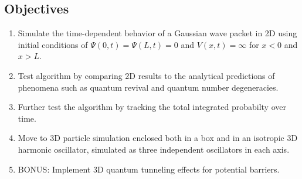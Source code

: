\documentclass[11pt, letterpaper]{article}
\begin{document}
\subsection*{Objectives}

\begin{enumerate}[noitemsep, topsep=0pt, parsep=0pt, partopsep=0pt]
\item Simulate the time-dependent behavior of a Gaussian wave packet in 2D using initial conditions of $\Psi(0, t) = \Psi(L, t) = 0$ and $V(x, t) = \infty$ for $x < 0$ and $x > L$.
\item Test algorithm by comparing 2D results to the analytical predictions of phenomena such as quantum revival and quantum number degeneracies.
\item Further test the algorithm by tracking the total integrated probabilty over time.
\item Move to 3D particle simulation enclosed both in a box and in an isotropic 3D harmonic oscillator, simulated as three independent oscillators in each axis.
\item BONUS: Implement 3D quantum tunneling effects for potential barriers.
\end{enumerate}
\end{document}
